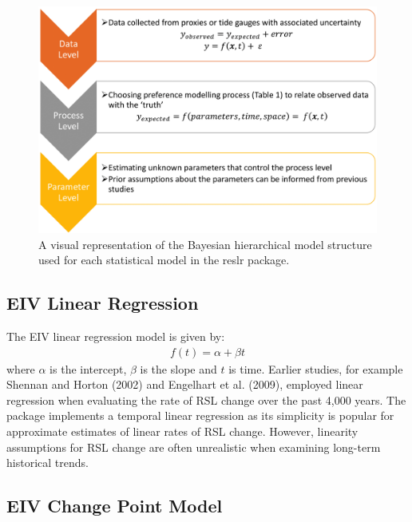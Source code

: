 \begin{figure}

{\centering \includegraphics[width=0.5\linewidth]{figures/hierarchical_model_def} 

}

\caption{A visual representation of the Bayesian hierarchical model structure used for each statistical model in the reslr package.}\label{fig:dag}
\end{figure}

\hypertarget{linearregression}{%
\subsection{EIV Linear Regression}\label{linearregression}}

The EIV linear regression model is given by:
\begin{align}
f(t) = \alpha + \beta t
\end{align}
where \(\alpha\) is the intercept, \(\beta\) is the slope and \(t\) is time. Earlier studies, for example Shennan and Horton (2002) and Engelhart et al. (2009), employed linear regression when evaluating the rate of RSL change over the past 4,000 years. The  package implements a temporal linear regression as its simplicity is popular for approximate estimates of linear rates of RSL change. However, linearity assumptions for RSL change are often unrealistic when examining long-term historical trends.

\hypertarget{changepointmodel}{%
\subsection{EIV Change Point Model}\label{changepointmodel}}

